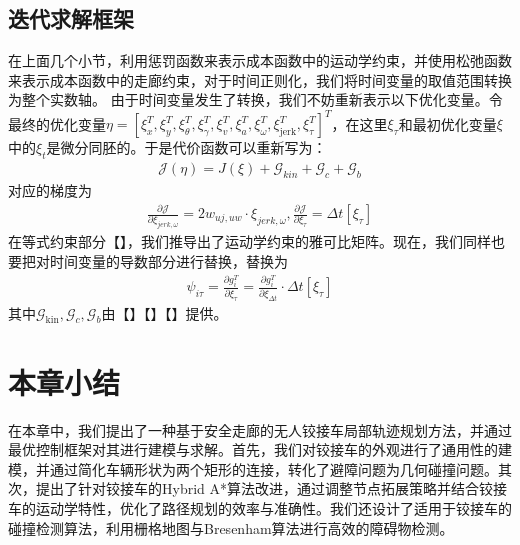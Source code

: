 \documentclass[master,academic]{ysuthesis} %
\begin{document}
		\subsection{迭代求解框架}
		在上面几个小节，利用惩罚函数来表示成本函数中的运动学约束，并使用松弛函数来表示成本函数中的走廊约束，对于时间正则化，我们将时间变量的取值范围转换为整个实数轴。
		由于时间变量发生了转换，我们不妨重新表示以下优化变量。令最终的优化变量$\eta =\left[ \xi _{x}^{T},\xi _{y}^{T},\xi _{\theta}^{T},\xi _{\gamma}^{T},\xi _{v}^{T},\xi _{a}^{T},\xi _{\omega}^{T},\xi _{\text{jerk}}^{T},\xi _{\tau}^{T} \right] ^T$，在这里$\xi _{\tau}$和最初优化变量$\xi$中的$\xi _{t}$是微分同胚的。于是代价函数可以重新写为：
		\begin{equation}
			\begin{aligned}
				\mathcal{J}\left( \eta \right) =J\left( \xi \right) +\mathcal{G}_{kin}+\mathcal{G}_c+\mathcal{G}_b
			\end{aligned}
		\end{equation}
		对应的梯度为
		\begin{equation}
			\begin{aligned}
				\frac{\partial \mathcal{J}}{\partial \xi _{jerk,\omega}}=2w_{uj,uw}\cdot \xi _{jerk,\omega},\frac{\partial \mathcal{J}}{\partial \xi _{\tau}}=\Delta t\left[ \xi _{\tau} \right]
			\end{aligned}
		\end{equation}
		在等式约束部分【】，我们推导出了运动学约束的雅可比矩阵。现在，我们同样也要把对时间变量的导数部分进行替换，替换为
		\begin{equation}
			\begin{aligned}
				\psi _{i\tau}=\frac{\partial g_{i}^{T}}{\partial \xi _{\tau}}=\frac{\partial g_{i}^{T}}{\partial \xi _{\Delta t}}\cdot \Delta t\left[ \xi _{\tau} \right] 
			\end{aligned}
		\end{equation}
		其中$\mathcal{G}_{\text{kin}},\mathcal{G}_c,\mathcal{G}_b$由【】【】【】提供。

	\section{本章小结}
	在本章中，我们提出了一种基于安全走廊的无人铰接车局部轨迹规划方法，并通过最优控制框架对其进行建模与求解。首先，我们对铰接车的外观进行了通用性的建模，并通过简化车辆形状为两个矩形的连接，转化了避障问题为几何碰撞问题。其次，提出了针对铰接车的Hybrid A*算法改进，通过调整节点拓展策略并结合铰接车的运动学特性，优化了路径规划的效率与准确性。我们还设计了适用于铰接车的碰撞检测算法，利用栅格地图与Bresenham算法进行高效的障碍物检测。
\end{document}
